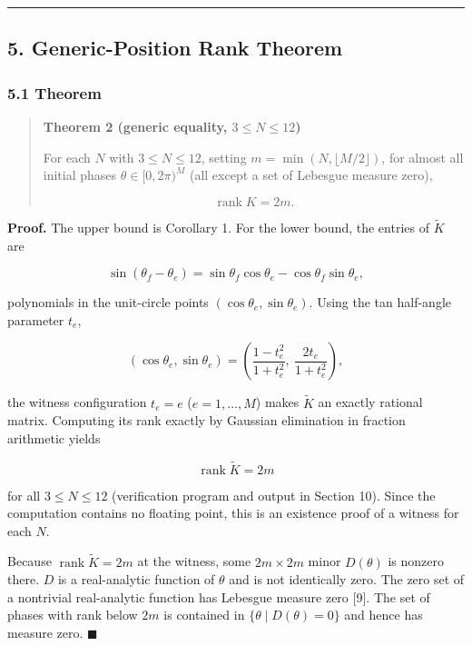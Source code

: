 \documentclass[
  a4paper,
]{article}
\begin{document}
\begin{center}\rule{0.5\linewidth}{0.5pt}\end{center}

\subsection{5. Generic-Position Rank
Theorem}\label{generic-position-rank-theorem}

\subsubsection{5.1 Theorem}\label{theorem-1}

\begin{quote}
\textbf{Theorem 2 (generic equality, \(3\le N\le12\))}

For each \(N\) with \(3\le N\le12\), setting
\(m=\min(N,\lfloor M/2\rfloor)\), for almost all initial phases
\(\theta\in[0,2\pi)^M\) (all except a set of Lebesgue measure zero),

\[
\operatorname{rank}K=2m.
\]
\end{quote}

\textbf{Proof.} The upper bound is Corollary 1. For the lower bound, the
entries of \(\widetilde K\) are

\[
\sin(\theta_f-\theta_e)
=
\sin\theta_f\cos\theta_e-\cos\theta_f\sin\theta_e,
\]

polynomials in the unit-circle points \((\cos\theta_e,\sin\theta_e)\).
Using the tan half-angle parameter \(t_e\),

\[
(\cos\theta_e,\sin\theta_e)
=
\left(\frac{1-t_e^2}{1+t_e^2},\ \frac{2t_e}{1+t_e^2}\right),
\]

the witness configuration \(t_e=e\) (\(e=1,\dots,M\)) makes
\(\widetilde K\) an exactly rational matrix. Computing its rank exactly
by Gaussian elimination in fraction arithmetic yields

\[
\operatorname{rank}\widetilde K=2m
\]

for all \(3\le N\le12\) (verification program and output in Section 10).
Since the computation contains no floating point, this is an existence
proof of a witness for each \(N\).

Because \(\operatorname{rank}\widetilde K=2m\) at the witness, some
\(2m\times2m\) minor \(D(\theta)\) is nonzero there. \(D\) is a
real-analytic function of \(\theta\) and is not identically zero. The
zero set of a nontrivial real-analytic function has Lebesgue measure
zero {[}9{]}. The set of phases with rank below \(2m\) is contained in
\(\{\theta\mid D(\theta)=0\}\) and hence has measure zero.
\(\blacksquare\)
\end{document}
